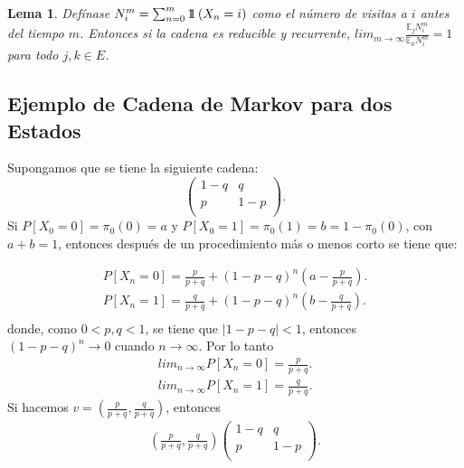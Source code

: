 \documentclass{article}
\newtheorem{Lema}{Lema}
\newcommand{\esp}{\mathbb{E}}
\newcommand{\indora}{\mbox{$1$\hspace{-0.8ex}$1$}}
\begin{document}
\begin{Lema}
Def\'inase $N_{i}^{m}=\sum_{n=0}^{m}\indora\left(X_{n}=i\right)$ como el n\'umero de visitas a $i$ antes del tiempo $m$. Entonces si la cadena es reducible y recurrente, $lim_{m\rightarrow\infty}\frac{\esp_{j}N_{i}^{m}}{\esp_{k}N_{i}^{m}}=1$ para todo $j,k\in E$.
\end{Lema}


%
\subsection{Ejemplo de Cadena de Markov para dos Estados}
%

Supongamos que se tiene la siguiente cadena:
\begin{equation}
\left(\begin{array}{cc}
1-q & q\\
p & 1-p\\
\end{array}
\right).
\end{equation}
Si $P\left[X_{0}=0\right]=\pi_{0}(0)=a$ y $P\left[X_{0}=1\right]=\pi_{0}(1)=b=1-\pi_{0}(0)$, con $a+b=1$, entonces despu\'es de un procedimiento m\'as o menos corto se tiene que:

\begin{eqnarray*}
P\left[X_{n}=0\right]=\frac{p}{p+q}+\left(1-p-q\right)^{n}\left(a-\frac{p}{p+q}\right).\\
P\left[X_{n}=1\right]=\frac{q}{p+q}+\left(1-p-q\right)^{n}\left(b-\frac{q}{p+q}\right).\\
\end{eqnarray*}
donde, como $0<p,q<1$, se tiene que $|1-p-q|<1$, entonces $\left(1-p-q\right)^{n}\rightarrow 0$ cuando $n\rightarrow\infty$. Por lo tanto
\begin{eqnarray*}
lim_{n\rightarrow\infty}P\left[X_{n}=0\right]=\frac{p}{p+q}.\\
lim_{n\rightarrow\infty}P\left[X_{n}=1\right]=\frac{q}{p+q}.
\end{eqnarray*}
Si hacemos $v=\left(\frac{p}{p+q},\frac{q}{p+q}\right)$, entonces
\begin{eqnarray*}
\left(\frac{p}{p+q},\frac{q}{p+q}\right)\left(\begin{array}{cc}
1-q & q\\
p & 1-p\\
\end{array}\right).
\end{eqnarray*}
\end{document}
